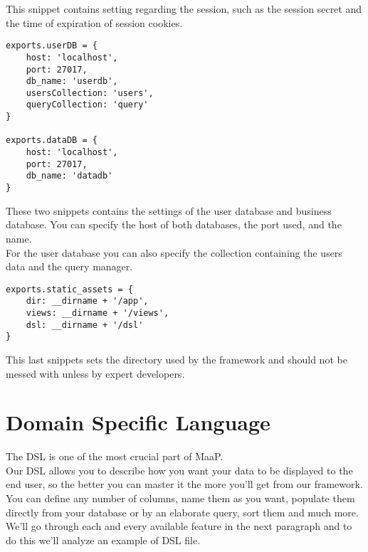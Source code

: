 This snippet contains setting regarding the session, such as the session secret and the time of expiration of session cookies.\\

\begin{lstlisting}
exports.userDB = {
	host: 'localhost',
	port: 27017,
	db_name: 'userdb',
	usersCollection: 'users',
	queryCollection: 'query'
}

exports.dataDB = {
	host: 'localhost',
	port: 27017,
	db_name: 'datadb'
}
\end{lstlisting}

These two snippets contains the settings of the user database and business database.
You can specify the host of both databases, the port used, and the name.\\

For the user database you can also specify the collection containing the users data and the query manager.\\


\begin{lstlisting}
exports.static_assets = {
	dir: __dirname + '/app',
	views: __dirname + '/views',
	dsl: __dirname + '/dsl'
}
\end{lstlisting}

This last snippets sets the directory used by the framework and should not be messed with unless by expert developers.

\section{Domain Specific Language}
\label{DSL}
The DSL is one of the most crucial part of MaaP.\\
Our DSL allows you to describe how you want your data to be displayed to the end user, so the better you can master it the more you'll get from our framework.
You can define any number of columns, name them as you want, populate them directly from your database or by an elaborate query, sort them and much more.\\

We'll go through each and every available feature  in the next paragraph and to do this we'll analyze an example of DSL file.\\

